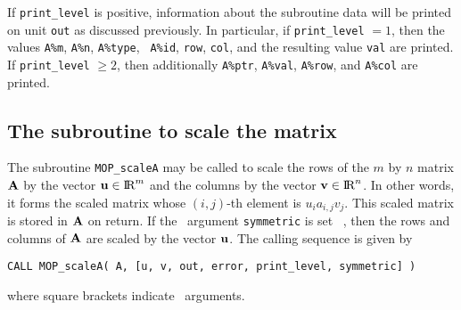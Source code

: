 \documentclass{galahad}
\newcommand{\packagename}{MOP}
\begin{document}
If {\tt print\_level} is positive, information about the subroutine
data will be printed on unit {\tt out} as discussed
previously.  In particular, if {\tt print\_level} $= 1$, then the
values {\tt A\%m}, {\tt A\%n}, {\tt A\%type}, {\tt
  A\%id}, {\tt row}, {\tt col}, and the resulting value {\tt val} are
printed.  If {\tt print\_level} $\geq 2$, then
additionally {\tt A\%ptr}, {\tt A\%val}, {\tt A\%row},
and {\tt A\%col} are printed.


\subsection{The subroutine to scale the matrix}\label{scaleA}

The subroutine {\tt \packagename\_scaleA} may be called to scale the
rows of the $m$ by $n$ matrix ${\mathbf{A}}$ by the vector ${\mathbf{u}}\in\hbox{I\hskip -1.5pt R}^m$
and the columns by the vector ${\mathbf{v}}\in\hbox{I\hskip -1.5pt R}^n$.  In other words, it
forms the scaled matrix whose $(i,j)$-th element is $u_ia_{i,j}v_j$.
This scaled matrix is stored in ${\mathbf{A}}$ on return.  If the \optional\
argument {\tt symmetric} is set \true\ , then the rows and columns of
${\mathbf{A}}$ are scaled by the vector ${\mathbf{u}}$.  The calling
sequence is given by \vspace*{1mm}

\hspace{8mm}
{\tt CALL \packagename\_scaleA( A, [u, v, out, error,
                                print\_level, symmetric] )}

\vspace*{1mm}
\noindent where square brackets indicate \optional\ arguments. 
\end{document}
